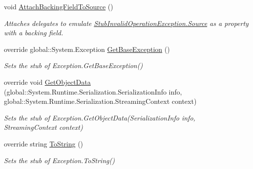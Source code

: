 \begin{DoxyCompactItemize}
void \hyperlink{class_system_1_1_fakes_1_1_stub_invalid_operation_exception_a0b8b8de90c94d03c8f6b4761acc8da7b}{Attach\-Backing\-Field\-To\-Source} ()
\begin{DoxyCompactList}\small\item\em Attaches delegates to emulate \hyperlink{class_system_1_1_fakes_1_1_stub_invalid_operation_exception_a01bff8a7ff7aba65094e0d033f0f1834}{Stub\-Invalid\-Operation\-Exception.\-Source} as a property with a backing field.\end{DoxyCompactList}\item 
override global\-::\-System.\-Exception \hyperlink{class_system_1_1_fakes_1_1_stub_invalid_operation_exception_ad236773d113af444a1df796800d79ca9}{Get\-Base\-Exception} ()
\begin{DoxyCompactList}\small\item\em Sets the stub of Exception.\-Get\-Base\-Exception()\end{DoxyCompactList}\item 
override void \hyperlink{class_system_1_1_fakes_1_1_stub_invalid_operation_exception_ade621d41dddf2c6bc75571c5773906af}{Get\-Object\-Data} (global\-::\-System.\-Runtime.\-Serialization.\-Serialization\-Info info, global\-::\-System.\-Runtime.\-Serialization.\-Streaming\-Context context)
\begin{DoxyCompactList}\small\item\em Sets the stub of Exception.\-Get\-Object\-Data(\-Serialization\-Info info, Streaming\-Context context)\end{DoxyCompactList}\item 
override string \hyperlink{class_system_1_1_fakes_1_1_stub_invalid_operation_exception_ac54b4dc72df4767a87e91cf25999de25}{To\-String} ()
\begin{DoxyCompactList}\small\item\em Sets the stub of Exception.\-To\-String()\end{DoxyCompactList}\end{DoxyCompactItemize}
